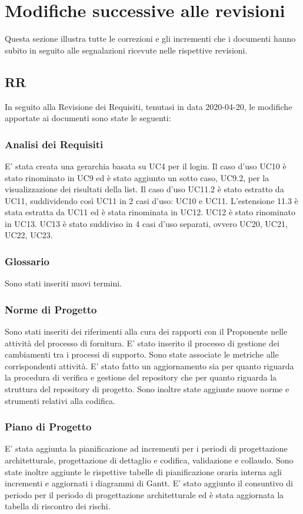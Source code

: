 \section{Modifiche successive alle revisioni}
Questa sezione illustra tutte le correzioni e gli incrementi che i documenti hanno subito in seguito alle segnalazioni ricevute nelle rispettive revisioni.

\subsection{RR}
In seguito alla Revisione dei Requisiti, tenutasi in data 2020-04-20, le modifiche apportate ai documenti sono state le seguenti:

	\subsubsection*{Analisi dei Requisiti}
	E' stata creata una gerarchia basata su UC4 per il login. Il caso d'uso UC10 è stato rinominato in UC9 ed è stato aggiunto un sotto caso, UC9.2, per la visualizzazione dei risultati della list. Il caso d'uso UC11.2 è stato estratto da UC11, suddividendo così UC11 in 2 casi d'uso: UC10 e UC11.  L’estensione 11.3 è stata estratta da UC11 ed è stata rinominata in UC12. UC12 è stato rinominato in UC13. UC13 è stato suddiviso in 4 casi d'uso separati, ovvero UC20, UC21, UC22, UC23.

	\subsubsection*{Glossario}
	Sono stati inseriti nuovi termini.

	\subsubsection*{Norme di Progetto}
	Sono stati inseriti dei riferimenti alla cura dei rapporti con il Proponente nelle attività del processo di fornitura. E' stato inserito il processo di gestione dei cambiamenti tra i processi di supporto. Sono state associate le metriche alle corrispondenti attività.
	E' stato fatto un aggiornamento sia per quanto riguarda la procedura di verifica e gestione del repository che per quanto riguarda la struttura del repository di progetto. Sono inoltre state aggiunte nuove norme e strumenti relativi alla codifica.

	\subsubsection*{Piano di Progetto}
	E' stata aggiunta la pianificazione ad incrementi per i periodi di progettazione architetturale, progettazione di dettaglio e codifica, validazione e collaudo. Sono state inoltre aggiunte le rispettive tabelle di pianificazione oraria interna agli incrementi e aggiornati i diagrammi di Gantt.
E' stato aggiunto il consuntivo di periodo per il periodo di progettazione architetturale ed è stata aggiornata la tabella di riscontro dei rischi.

